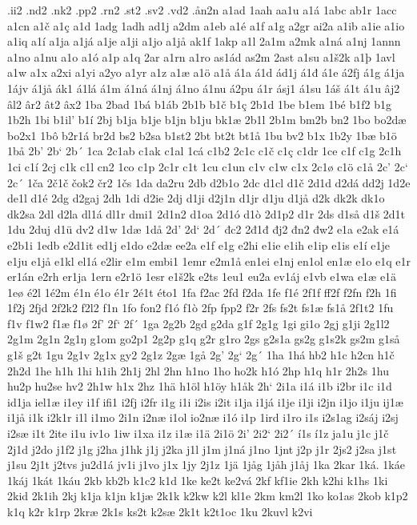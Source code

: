 .ii2
.nd2
.nk2
.pp2
.rn2
.st2
.sv2
.vd2
.ån2n
a1ad
1aah
aa1u
a1á
1abc
ab1r
1acc
a1cn
a1č
a1ç
a1d
1adg
1adh
ad1j
a2dm
a1eb
a1é
a1f
a1g
a2gr
ai2a
a1ib
a1ie
a1io
a1iq
a1í
a1ja
a1já
a1je
a1ji
a1jo
a1jå
ak1f
1akp
a1l
2a1m
a2mk
a1ná
a1nj
1annn
a1no
a1nu
a1o
a1ó
a1p
a1q
2ar
a1rn
a1ro
as1ád
as2m
2ast
a1su
a1š2k
a1þ
1avl
a1w
a1x
a2xi
a1yi
a2yo
a1yr
a1z
a1æ
a1ö
a1å
á1a
á1d
ád1j
á1đ
á1e
á2fj
á1g
á1ja
1ájv
á1jå
ák1
á1lá
á1m
á1ná
á1nj
á1no
á1nu
á2pu
á1r
ásj1
á1su
1áš
á1t
á1u
âj2
âl2
âr2
ât2
âx2
1ba
2bad
1bá
b1áb
2b1b
b1č
b1ç
2b1d
1be
b1em
1bé
b1f2
b1g
1b2h
1bi
b1il'
b1í
2bj
b1ja
b1je
b1jn
b1ju
bk1æ
2b1l
2b1m
bm2b
bn2
1bo
bo2dæ
bo2x1
1bô
b2r1á
br2d
bs2
b2sa
b1st2
2bt
bt2t
bt1å
1bu
bv2
b1x
1b2y
1bæ
b1ö
1bå
2b'
2b`
2b´
1ca
2c1ab
c1ak
c1al
1cá
c1b2
2c1c
c1č
c1ç
c1dr
1ce
c1f
c1g
2c1h
1ci
c1í
2cj
c1k
c1l
cn2
1co
c1p
2c1r
c1t
1cu
c1un
c1v
c1w
c1x
2c1ø
c1ö
c1å
2c'
2c`
2c´
1ča
2č1č
čok2
čr2
1čs
1da
da2ru
2db
d2b1o
2dc
d1cl
d1č
2d1d
d2dá
dd2j
1d2e
de1l
d1é
2dg
d2gaj
2dh
1di
d2ie
2dj
d1ji
d2j1n
d1jr
d1ju
d1jå
d2k
dk2k
dk1o
dk2sa
2dl
d2la
dl1á
dl1r
dmi1
2d1n2
d1oa
2d1ó
d1ò
2d1p2
d1r
2ds
d1så
d1š
2d1t
1du
2duj
d1ü
dv2
d1w
1dæ
1då
2d'
2d`
2d´
đc2
2đ1đ
đj2
đn2
đw2
e1a
e2ak
e1á
e2b1i
1edb
e2d1it
ed1j
e1do
e2dæ
ee2a
e1f
e1g
e2hi
e1ie
e1ih
e1ip
e1is
e1í
e1je
e1ju
e1jå
e1kl
el1á
e2lir
e1m
embi1
1emr
e2m1å
en1ei
e1nj
en1ol
en1æ
e1o
e1q
e1r
er1án
e2rh
er1ja
1ern
e2r1ö
1esr
e1š2k
e2ts
1eu1
eu2a
ev1áj
e1vb
e1wa
e1æ
e1ä
1eø
é2l
1é2m
é1n
é1o
é1r
2é1t
éto1
1fa
f2ac
2fd
f2da
1fe
f1é
2f1f
ff2f
f2fn
f2h
1fi
1f2j
2fjd
2f2k2
f2l2
f1n
1fo
fon2
f1ó
f1ò
2fp
fpp2
f2r
2fs
fs2t
fs1æ
fs1å
2f1t2
1fu
f1v
f1w2
f1æ
f1ø
2f'
2f`
2f´
1ga
2g2b
2gd
g2da
g1f
2g1g
1gi
gi1o
2gj
g1ji
2g1l2
2g1m
2g1n
2g1ŋ
g1om
go2p1
2g2p
g1q
g2r
g1ro
2gs
g2s1a
gs2g
g1s2k
gs2m
g1så
g1š
g2t
1gu
2g1v
2g1x
gy2
2g1z
2gæ
1gå
2g'
2g`
2g´
1ha
1há
hb2
h1c
h2cn
h1č
2h2d
1he
h1h
1hi
h1ih
2h1j
2hl
2hn
h1no
1ho
ho2k
h1ó
2hp
h1q
h1r
2h2s
1hu
hu2p
hu2se
hv2
2h1w
h1x
2hz
1hä
h1öl
h1öy
h1åk
2h`
2i1a
i1á
i1b
i2br
i1c
i1d
id1ja
iel1æ
i1ey
i1f
ifi1
i2fj
i2fr
i1g
i1i
i2is
i2it
i1ja
i1já
i1je
i1ji
i2jn
i1jo
i1ju
ij1æ
i1jå
i1k
i2k1r
i1l
i1mo
2i1n
i2næ
i1ol
io2næ
i1ó
i1p
1ird
i1ro
i1s
i2s1ag
i2sáj
i2sj
i2sæ
i1t
2ite
i1u
iv1o
1iw
i1xa
i1z
i1æ
i1ä
2i1ö
2i'
2i2`
2i2´
í1s
í1z
ja1u
j1c
j1č
2j1d
j2do
j1f2
j1g
j2ha
j1hk
j1j
j2ka
j1l
j1m
j1ná
j1no
1jnt
j2p
j1r
2js2
j2sa
j1st
j1su
2j1t
j2tvs
ju2d1á
jv1i
j1vo
j1x
1jy
2j1z
1jä
1jåg
1jåh
j1åj
1ka
2kar
1ká.
1káe
1káj
1kát
1káu
2kb
kb2b
k1c2
k1d
1ke
ke2t
ke2vá
2kf
kf1ie
2kh
k2hi
k1hs
1ki
2kid
2k1ih
2kj
k1ja
k1jn
k1jæ
2k1k
k2kw
k2l
kl1e
2km
km2l
1ko
ko1as
2kob
k1p2
k1q
k2r
k1rp
2kræ
2k1s
ks2t
k2sæ
2k1t
k2t1oc
1ku
2kuvl
k2vi
